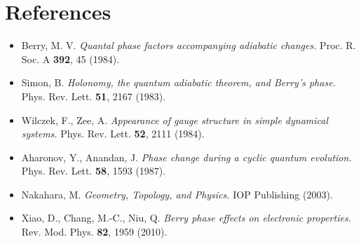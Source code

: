 \documentclass[11pt,a4paper]{article}
\begin{document}
\section*{References}

\begin{itemize}[leftmargin=*,itemsep=2pt]
  \item Berry, M. V. \emph{Quantal phase factors accompanying adiabatic changes.} Proc. R. Soc. A \textbf{392}, 45 (1984).
  \item Simon, B. \emph{Holonomy, the quantum adiabatic theorem, and Berry's phase.} Phys. Rev. Lett. \textbf{51}, 2167 (1983).
  \item Wilczek, F., Zee, A. \emph{Appearance of gauge structure in simple dynamical systems.} Phys. Rev. Lett. \textbf{52}, 2111 (1984).
  \item Aharonov, Y., Anandan, J. \emph{Phase change during a cyclic quantum evolution.} Phys. Rev. Lett. \textbf{58}, 1593 (1987).
  \item Nakahara, M. \emph{Geometry, Topology, and Physics.} IOP Publishing (2003).
  \item Xiao, D., Chang, M.-C., Niu, Q. \emph{Berry phase effects on electronic properties.} Rev. Mod. Phys. \textbf{82}, 1959 (2010).
\end{itemize}
\end{document}
